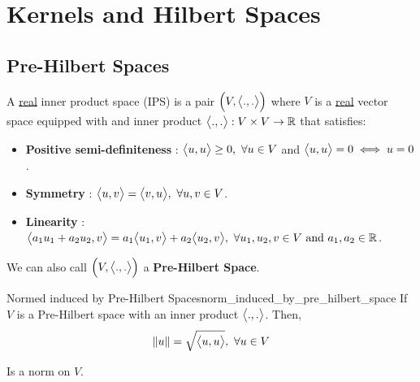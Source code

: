 \newpage
\section{Kernels and Hilbert Spaces}
\subsection{Pre-Hilbert Spaces}

\begin{definition}
    A \underline{real} inner product space (IPS) is a pair $\Big( V, \big<.,.\big> \Big)$ where $V$ is a \underline{real} vector space equipped with and inner product $\big<.,.\big>: V\times V \to \mathbb{R}$ that satisfies:
    \begin{itemize}
        \item \textbf{Positive semi-definiteness} : $\big<u,u\big>\ge0, \ \forall u\in V$ and $\big<u,u\big>=0\iff u=0$.
        \item \textbf{Symmetry} : $\big<u,v\big> = \big<v, u\big>, \ \forall u,v\in V$.
        \item \textbf{Linearity} : $\big<a_1u_1 + a_2u_2, v\big> = a_1\big<u_1, v\big> + a_2\big<u_2, v\big>, \ \forall u_1, u_2, v \in V \text{ and } a_1, a_2 \in \mathbb{R}$.
    \end{itemize}

    \noindent We can also call $\Big( V, \big<.,.\big> \Big)$ a \textbf{Pre-Hilbert Space}.
\end{definition}

\begin{proposition}{Normed induced by Pre-Hilbert Spaces}{norm_induced_by_pre_hilbert_space}
    If $V$ is a Pre-Hilbert space with an inner product $\big<.,.\big>$. Then,
    \begin{align*}
        \|u\| = \sqrt{\big<u,u\big>}, \ \forall u \in V
    \end{align*}

    \noindent Is a norm on $V$.
\end{proposition}

